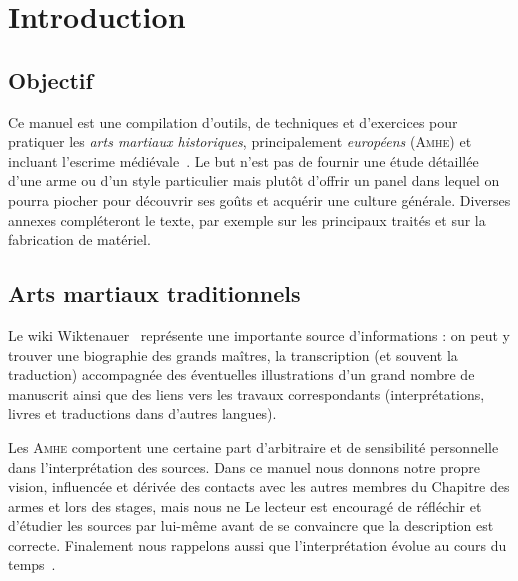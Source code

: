 \chapter{Introduction}


\section{Objectif}


Ce manuel est une compilation d'outils, de techniques et d'exercices pour pratiquer les \emph{arts martiaux historiques}, principalement \emph{européens} (\textsc{Amhe}) et incluant l'escrime médiévale~\footnotemark{}.
Le but n'est pas de fournir une étude détaillée d'une arme ou d'un style particulier mais plutôt d'offrir un panel dans lequel on pourra piocher pour découvrir ses goûts et acquérir une culture générale.
Diverses annexes compléteront le texte, par exemple sur les principaux traités et sur la fabrication de matériel.


\section{Arts martiaux traditionnels}




Le wiki Wiktenauer~\cite{wiktenauer} représente une importante source d'informations : on peut y trouver une biographie des grands maîtres, la transcription (et souvent la traduction) accompagnée des éventuelles illustrations d'un grand nombre de manuscrit ainsi que des liens vers les travaux correspondants (interprétations, livres et traductions dans d'autres langues).

Les \textsc{Amhe} comportent une certaine part d'arbitraire et de sensibilité personnelle dans l'interprétation des sources.
Dans ce manuel nous donnons notre propre vision, influencée et dérivée des contacts avec les autres membres du Chapitre des armes et lors des stages, mais nous ne 
Le lecteur est encouragé de réfléchir et d'étudier les sources par lui-même avant de se convaincre que la description est correcte.
Finalement nous rappelons aussi que l'interprétation évolue au cours du temps~\footnotemark{}.


